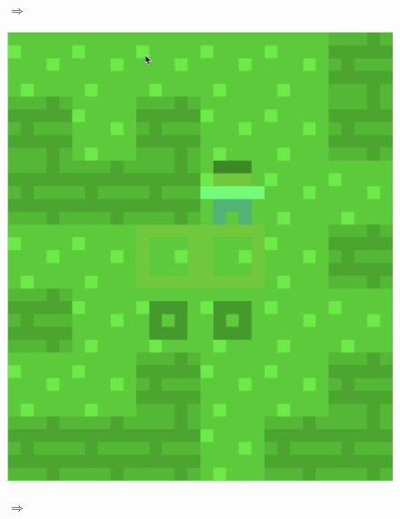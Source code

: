 \begin{figure}[!htbp]
\begin{minipage}[t]{0.2\textwidth}
\end{minipage}
$\Longrightarrow$
\begin{minipage}[t]{0.2\textwidth}
\includegraphics[width=\textwidth]{figures/maxii4_green.png} \hfill \\
\end{minipage}
$\Longrightarrow$
\begin{minipage}[t]{0.2\textwidth}

\end{minipage}
\end{figure}
